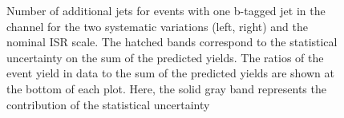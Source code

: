 \begin{figure}[htbp!]
\begin{center}
\caption{Number of additional jets for events with one b-tagged jet in the \emu channel for the two systematic variations (left, right) and the nominal ISR scale.
The hatched bands correspond to the statistical uncertainty on the sum of the predicted yields. 
        The ratios of the event yield in data to the sum of the predicted yields are
        shown at the bottom of each plot. Here, the solid gray band
        represents the contribution of the statistical uncertainty
  \label{fig:control_var_TT_ISRSCALE}}
  \end{center}
\end{figure}

\begin{figure}[htbp!]
  \begin{center}
    \\

\end{center}
\end{figure}

